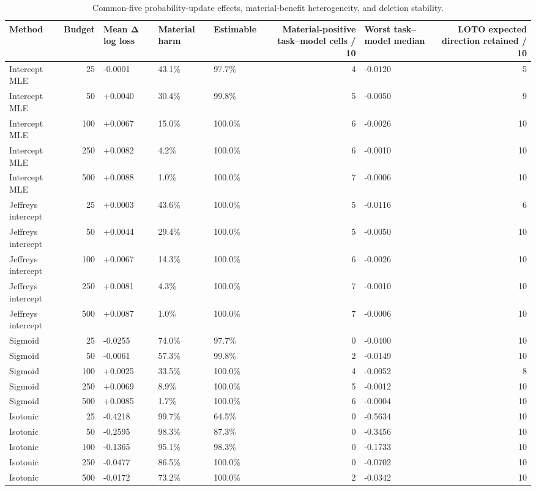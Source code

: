 \begin{table}[t]
\centering
\footnotesize
\begin{tabular}{lrlllrlr}
\toprule
Method & Budget & Mean Δ log loss & Material harm & Estimable & Material-positive task–model cells / 10 & Worst task–model median & LOTO expected direction retained / 10 \\
\midrule
Intercept MLE & 25 & -0.0001 & 43.1\% & 97.7\% & 4 & -0.0120 & 5 \\
Intercept MLE & 50 & +0.0040 & 30.4\% & 99.8\% & 5 & -0.0050 & 9 \\
Intercept MLE & 100 & +0.0067 & 15.0\% & 100.0\% & 6 & -0.0026 & 10 \\
Intercept MLE & 250 & +0.0082 & 4.2\% & 100.0\% & 6 & -0.0010 & 10 \\
Intercept MLE & 500 & +0.0088 & 1.0\% & 100.0\% & 7 & -0.0006 & 10 \\
Jeffreys intercept & 25 & +0.0003 & 43.6\% & 100.0\% & 5 & -0.0116 & 6 \\
Jeffreys intercept & 50 & +0.0044 & 29.4\% & 100.0\% & 5 & -0.0050 & 10 \\
Jeffreys intercept & 100 & +0.0067 & 14.3\% & 100.0\% & 6 & -0.0026 & 10 \\
Jeffreys intercept & 250 & +0.0081 & 4.3\% & 100.0\% & 7 & -0.0010 & 10 \\
Jeffreys intercept & 500 & +0.0087 & 1.0\% & 100.0\% & 7 & -0.0006 & 10 \\
Sigmoid & 25 & -0.0255 & 74.0\% & 97.7\% & 0 & -0.0400 & 10 \\
Sigmoid & 50 & -0.0061 & 57.3\% & 99.8\% & 2 & -0.0149 & 10 \\
Sigmoid & 100 & +0.0025 & 33.5\% & 100.0\% & 4 & -0.0052 & 8 \\
Sigmoid & 250 & +0.0069 & 8.9\% & 100.0\% & 5 & -0.0012 & 10 \\
Sigmoid & 500 & +0.0085 & 1.7\% & 100.0\% & 6 & -0.0004 & 10 \\
Isotonic & 25 & -0.4218 & 99.7\% & 64.5\% & 0 & -0.5634 & 10 \\
Isotonic & 50 & -0.2595 & 98.3\% & 87.3\% & 0 & -0.3456 & 10 \\
Isotonic & 100 & -0.1365 & 95.1\% & 98.3\% & 0 & -0.1733 & 10 \\
Isotonic & 250 & -0.0477 & 86.5\% & 100.0\% & 0 & -0.0702 & 10 \\
Isotonic & 500 & -0.0172 & 73.2\% & 100.0\% & 2 & -0.0342 & 10 \\
\bottomrule
\end{tabular}
\caption{Common-five probability-update effects, material-benefit heterogeneity, and deletion stability.}
\label{tab:h2h3}
\end{table}
